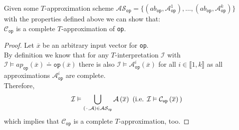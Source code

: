 \begin{lemma}
Given some $T$-approximation scheme 
$\mathcal{AS}_{\texttt{op}} = \{ \left(ab_{\texttt{op}}, \mathcal{A}^1_{\texttt{op}}\right),\dots,\left(ab_{\texttt{op}}, \mathcal{A}^k_{\texttt{op}}\right) \}$
with the properties defined above we can show that:\\
$\mathcal{C}_{\texttt{op}}$ is a complete $T$-approximation of \texttt{op}.
\begin{proof}
Let $\overline{x}$ be an arbitrary input vector for \texttt{op}.\\
By definition we know that for any $T$-interpretation $\mathcal{I}$ with $\mathcal{I} \vDash ap_{\texttt{op}}\left(\overline{x}\right) \doteq \texttt{op}\left(\overline{x}\right)$ there is also $\mathcal{I} \vDash \mathcal{A}^i_{\texttt{op}}\left(\overline{x}\right)$ for all $i\in\llbracket1,k\rrbracket$ as all approximations $\mathcal{A}^i_{\texttt{op}}$ are complete.\\
Therefore,
\[
    \mathcal{I} \vDash \bigcup\limits_{\left({\mkern 2mu\cdot\mkern 2mu},\mathcal{A}\right)\in\mathcal{AS}_{\texttt{op}}} \mathcal{A}\left(\overline{x}\right)
    \text{ (i.e. }\mathcal{I} \vDash \mathcal{C}_{\texttt{op}}\left(\overline{x}\right)\text{)}
\]
which implies that $\mathcal{C}_{\texttt{op}}$ is a complete $T$-approximation, too.
\end{proof}
\end{lemma}

